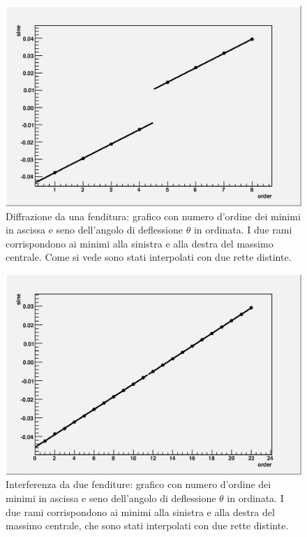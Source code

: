 \documentclass[italian,a4paper]{article}
\begin{document}
\begin{figure}[ph]\centering
\includegraphics[scale=.6]{1slit.outsin.eps}
\caption{Diffrazione da una fenditura: grafico con numero d'ordine dei minimi in ascissa e seno dell'angolo di deflessione $\theta$ in ordinata. I due rami corrispondono ai minimi alla sinistra e alla destra del massimo centrale. Come si vede sono stati interpolati con due rette distinte.}\label{1slitsin}
\end{figure}
\begin{figure}[ph]\centering
\includegraphics[scale=.6]{2slits.outsin.eps}
\caption{Interferenza da due fenditure: grafico con numero d'ordine dei minimi in ascissa e seno dell'angolo di deflessione $\theta$ in ordinata. I due rami corrispondono ai minimi alla sinistra e alla destra del massimo centrale, che sono stati interpolati con due rette distinte.}\label{2slitssin}
\end{figure}
\end{document}
